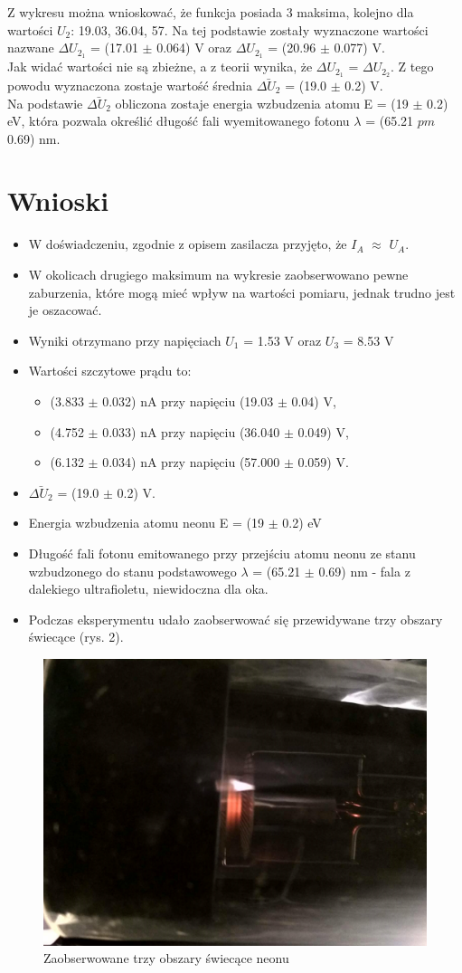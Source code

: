 \documentclass[12pt, a4paper, oneside]{article}
\begin{document}
Z wykresu można wnioskować, że funkcja posiada 3 maksima, kolejno dla wartości $U_2$: 19.03, 36.04, 57. Na tej podstawie zostały wyznaczone wartości nazwane $\Delta U_{2_1}$ = (17.01 $\pm$ 0.064) V oraz $\Delta U_{2_1}$ = (20.96 $\pm$ 0.077) V.\\
\indent Jak widać wartości nie są zbieżne, a z teorii wynika, że $\Delta U_{2_1}$ = $\Delta U_{2_2}$. Z tego powodu wyznaczona zostaje wartość średnia $\bar{\Delta U_2}$ = (19.0 $\pm$ 0.2) V.\\
\indent Na podstawie $\bar{\Delta U_2}$ obliczona zostaje energia wzbudzenia atomu E = (19 $\pm$ 0.2) eV, która pozwala określić długość fali wyemitowanego fotonu $\lambda$ = (65.21 $pm$ 0.69) nm.
\section{Wnioski}
\begin{itemize}
\item W doświadczeniu, zgodnie z opisem zasilacza przyjęto, że $I_A$ $\approx$ $U_A$.
\item W okolicach drugiego maksimum na wykresie zaobserwowano pewne zaburzenia, które mogą mieć wpływ na wartości pomiaru, jednak trudno jest je oszacować.
\item Wyniki otrzymano przy napięciach $U_1$ = 1.53 V oraz $U_3$ = 8.53 V
\item Wartości szczytowe prądu to:
\begin{itemize}
\item (3.833 $\pm$ 0.032) nA przy napięciu (19.03 $\pm$ 0.04) V,
\item (4.752 $\pm$ 0.033) nA przy napięciu (36.040 $\pm$ 0.049) V,
\item (6.132 $\pm$ 0.034) nA przy napięciu (57.000 $\pm$ 0.059) V.
\end{itemize}
\item $\bar{\Delta U_2}$ = (19.0 $\pm$ 0.2) V.
\item Energia wzbudzenia atomu neonu E = (19 $\pm$ 0.2) eV
\item Długość fali fotonu emitowanego przy przejściu atomu neonu ze stanu wzbudzonego do stanu podstawowego $\lambda$ = (65.21 $\pm$ 0.69) nm - fala z dalekiego ultrafioletu, niewidoczna dla oka.
\item Podczas eksperymentu udało zaobserwować się przewidywane trzy obszary świecące (rys. 2).
\end{itemize}
\clearpage
\begin{figure}[t]
\centering
\caption{Zaobserwowane trzy obszary świecące neonu}
\includegraphics[scale=0.35]{fo1.png}
\end{figure}
\end{document}
